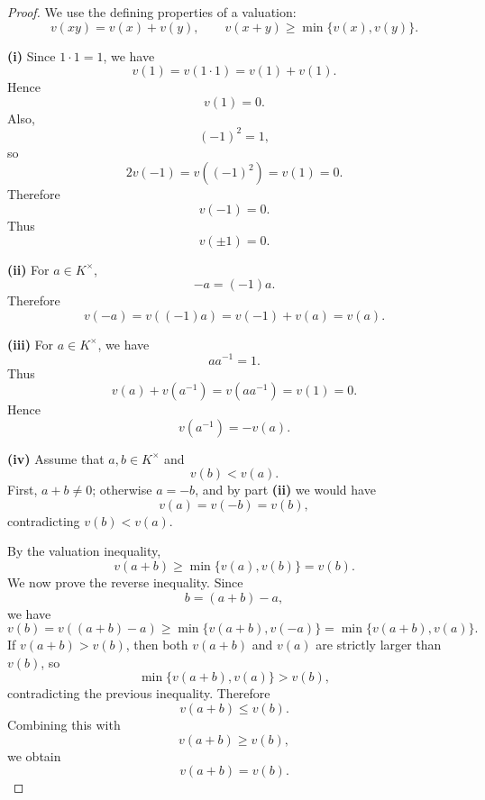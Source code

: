     \begin{proof}
    We use the defining properties of a valuation:
    \[
    v(xy)=v(x)+v(y),
    \qquad
    v(x+y)\geq \min\{v(x),v(y)\}.
    \]
    
    \textbf{(i)}
    Since \(1\cdot 1=1\), we have
    \[
    v(1)=v(1\cdot 1)=v(1)+v(1).
    \]
    Hence
    \[
    v(1)=0.
    \]
    Also,
    \[
    (-1)^2=1,
    \]
    so
    \[
    2v(-1)=v((-1)^2)=v(1)=0.
    \]
    Therefore
    \[
    v(-1)=0.
    \]
    Thus
    \[
    v(\pm 1)=0.
    \]
    
    \textbf{(ii)}
    For \(a\in K^\times\),
    \[
    -a=(-1)a.
    \]
    Therefore
    \[
    v(-a)=v((-1)a)=v(-1)+v(a)=v(a).
    \]
    
    \textbf{(iii)}
    For \(a\in K^\times\), we have
    \[
    aa^{-1}=1.
    \]
    Thus
    \[
    v(a)+v(a^{-1})=v(aa^{-1})=v(1)=0.
    \]
    Hence
    \[
    v(a^{-1})=-v(a).
    \]
    
    \textbf{(iv)}
    Assume that \(a,b\in K^\times\) and
    \[
    v(b)<v(a).
    \]
    First, \(a+b\neq 0\); otherwise \(a=-b\), and by part \textbf{(ii)} we would have
    \[
    v(a)=v(-b)=v(b),
    \]
    contradicting \(v(b)<v(a)\).
    
    By the valuation inequality,
    \[
    v(a+b)\geq \min\{v(a),v(b)\}=v(b).
    \]
    We now prove the reverse inequality. Since
    \[
    b=(a+b)-a,
    \]
    we have
    \[
    v(b)
    =
    v((a+b)-a)
    \geq
    \min\{v(a+b),v(-a)\}
    =
    \min\{v(a+b),v(a)\}.
    \]
    If \(v(a+b)>v(b)\), then both \(v(a+b)\) and \(v(a)\) are strictly larger than \(v(b)\),
    so
    \[
    \min\{v(a+b),v(a)\}>v(b),
    \]
    contradicting the previous inequality. Therefore
    \[
    v(a+b)\leq v(b).
    \]
    Combining this with
    \[
    v(a+b)\geq v(b),
    \]
    we obtain
    \[
    v(a+b)=v(b).
    \]
    \end{proof}

